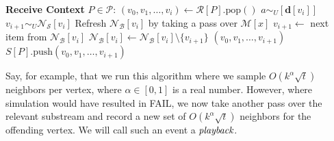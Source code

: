 \documentclass[10]{article}
\newcommand{\push}[1]{\text{push} \left ( #1 \right )}
\newcommand{\pop}{\text{pop}()}
\begin{document}
\begin{algorithm}[htbp]
\begin{flushleft}
\end{flushleft}
\begin{flushleft}
\begin{algorithmic}[1]
	\Statex \textbf{Receive Context} $P \in \mathcal{P}$:
  			\State $(v_0, v_1, \dots, v_i) \gets \mathcal{R}[P].\pop$
			\State $a \sim_U [\mathbf{d}[{v_i}]] $
				\State $v_{i+1} \sim_U \mathcal{N}_\mathcal{S}[v_i]$
			\Else
					\State Refresh $\mathcal{N}_\mathcal{B}[v_i]$ by taking a pass over $\mathcal{M}[x]$
				\EndIf
				\State $v_{i+1} \gets$ next item from $\mathcal{N}_\mathcal{B}[v_i]$
				\State $\mathcal{N}_\mathcal{B}[v_i] \gets \mathcal{N}_\mathcal{B}[v_i] \setminus \{v_{i+1}\}$
			\EndIf
				\State \Return $(v_0, v_1, \dots, v_{i+1})$
			\Else
				\State $S[P].\push{v_0, v_1, \dots, v_{i+1}}$
			\EndIf
  		\EndWhile
\end{algorithmic}
\end{flushleft}
\end{algorithm}


Say, for example, that we run this algorithm where we sample $O(k^\alpha \sqrt{t})$ neighbors per vertex, where $\alpha \in [0,1]$ is a real number.
However, where simulation would have resulted in FAIL, we now take another pass over the relevant substream and record a new set of $O(k^\alpha \sqrt{t})$ neighbors for the offending vertex.
We will call such an event a $\emph{playback}$.
\end{document}
